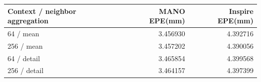 \begin{tabular}{lrr}
\toprule
Context / neighbor aggregation & MANO EPE(mm) & Inspire EPE(mm)\\
\midrule
64 / mean & 3.456930 & 4.392716\\
256 / mean & 3.457202 & 4.390056\\
64 / detail & 3.465854 & 4.399568\\
256 / detail & 3.464157 & 4.397399\\
\bottomrule
\end{tabular}

